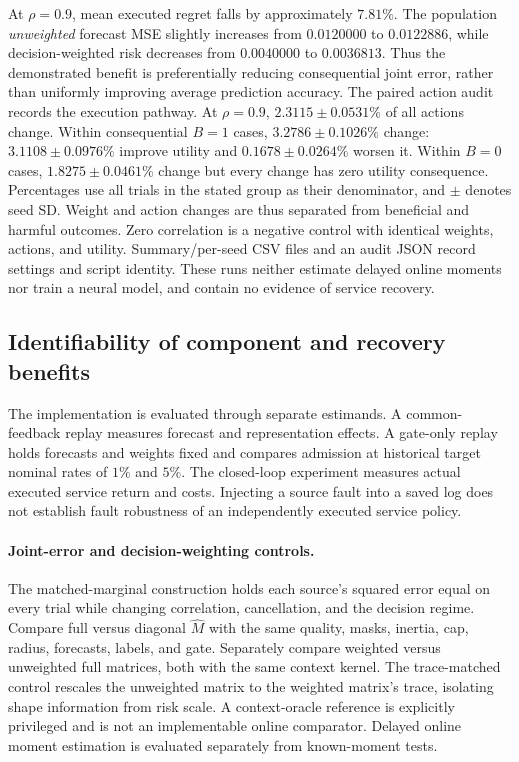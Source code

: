 \documentclass[10pt]{article}
\begin{document}
At $\rho=0.9$, mean executed regret falls by approximately $7.81\%$.
The population \emph{unweighted} forecast MSE slightly increases from
$0.0120000$ to $0.0122886$, while decision-weighted risk decreases from
$0.0040000$ to $0.0036813$. Thus the demonstrated benefit is preferentially
reducing consequential joint error, rather than uniformly improving average
prediction accuracy. The paired action audit records the execution pathway.
At $\rho=0.9$, $2.3115\pm0.0531\%$ of all actions change. Within
consequential $B=1$ cases, $3.2786\pm0.1026\%$ change:
$3.1108\pm0.0976\%$ improve utility and $0.1678\pm0.0264\%$ worsen it.
Within $B=0$ cases, $1.8275\pm0.0461\%$ change but every change has zero
utility consequence. Percentages use all trials in the stated group as their
denominator, and $\pm$ denotes seed SD. Weight and action changes are thus
separated from beneficial and harmful outcomes. Zero correlation is a negative
control with identical weights, actions, and utility. Summary/per-seed CSV files and an audit JSON
record settings and script identity. These runs neither estimate delayed online
moments nor train a neural model, and contain no evidence of service recovery.

\subsection{Identifiability of component and recovery benefits}
\label{sec:method-validation}

The implementation is evaluated through separate estimands. A common-feedback
replay measures forecast and representation effects. A gate-only replay holds
forecasts and weights fixed and compares admission at historical target nominal
rates of $1\%$ and $5\%$. The closed-loop experiment measures actual executed
service return and costs. Injecting a source fault into a saved log does not
establish fault robustness of an independently executed service policy.

\paragraph{Joint-error and decision-weighting controls.}
The matched-marginal construction holds each source's squared error equal on
every trial while changing correlation, cancellation, and the decision regime.
Compare full versus diagonal $\widehat M$ with the same quality, masks, inertia,
cap, radius, forecasts, labels, and gate. Separately compare weighted versus
unweighted full matrices, both with the same context kernel. The trace-matched
control rescales the unweighted matrix to the weighted matrix's trace, isolating
shape information from risk scale. A context-oracle reference is explicitly
privileged and is not an implementable online comparator. Delayed online moment
estimation is evaluated separately from known-moment tests.
\end{document}
